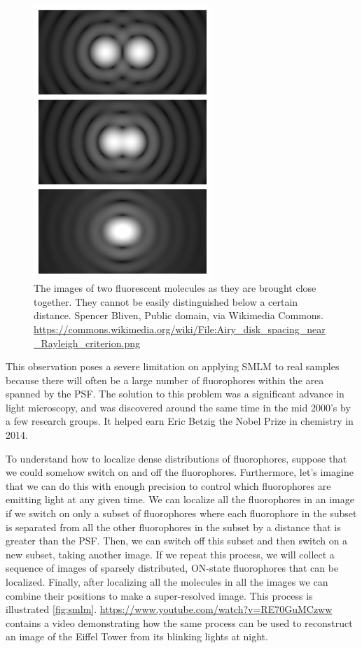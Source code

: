 \documentclass[10pt,a4paper,oneside]{book}
\begin{document}
\begin{figure}[ht]
    \centering
    \includegraphics[width=0.6\textwidth]{Airy_disk_spacing_near_Rayleigh_criterion.png}
    \caption{The images of two fluorescent molecules as they are brought close together. They cannot be easily distinguished below a certain distance. Spencer Bliven, Public domain, via Wikimedia Commons. \url{https://commons.wikimedia.org/wiki/File:Airy_disk_spacing_near_Rayleigh_criterion.png}}
    \label{fig:rayleigh}
\end{figure}

This observation poses a severe limitation on applying SMLM to real samples because there will often be a large number of fluorophores within the area spanned by the PSF. The solution to this problem was a significant advance in light microscopy, and was discovered around the same time in the mid 2000's by a few research groups. It helped earn Eric Betzig the Nobel Prize in chemistry in 2014.

To understand how to localize dense distributions of fluorophores, suppose that we could somehow switch on and off the fluorophores. Furthermore, let's imagine that we can do this with enough precision to control which fluorophores are emitting light at any given time. We can localize all the fluorophores in an image if we switch on only a subset of fluorophores where each fluorophore in the subset is separated from all the other fluorophores in the subset by a distance that is greater than the PSF. Then, we can switch off this subset and then switch on a new subset, taking another image. If we repeat this process, we will collect a sequence of images of sparsely distributed, ON-state fluorophores that can be localized. Finally, after localizing all the molecules in all the images we can combine their positions to make a super-resolved image. This process is illustrated \autoref{fig:smlm}. \url{https://www.youtube.com/watch?v=RE70GuMCzww} contains a video demonstrating how the same process can be used to reconstruct an image of the Eiffel Tower from its blinking lights at night.
\end{document}
